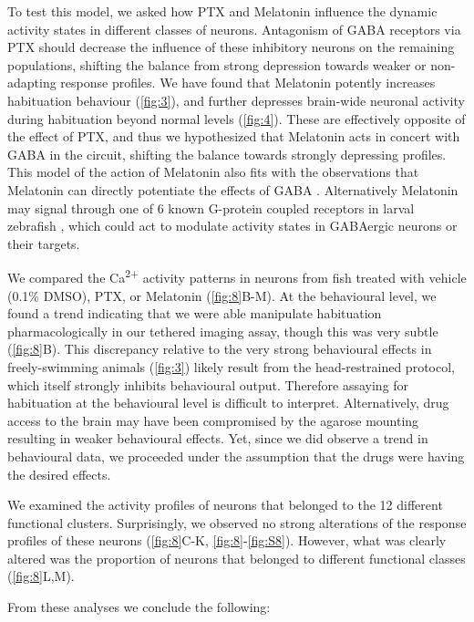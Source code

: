 \documentclass[9pt,lineno]{RandlettLab_elife}
\begin{document}
To test this model, we asked how PTX and Melatonin influence the dynamic activity states in different classes of neurons. Antagonism of GABA receptors via PTX should decrease the influence of these inhibitory neurons on the remaining populations, shifting the balance from strong depression towards weaker or non-adapting response profiles. We have found that Melatonin potently increases habituation behaviour (\autoref{fig:3}), and further depresses brain-wide neuronal activity during habituation beyond normal levels (\autoref{fig:4}). These are effectively opposite of the effect of PTX, and thus we hypothesized that Melatonin acts in concert with GABA in the circuit, shifting the balance towards strongly depressing profiles. This model of the action of Melatonin also fits with the observations that Melatonin can directly potentiate the effects of GABA \cite{Cheng2012-gv, Niles1987-oc}. Alternatively Melatonin may signal through one of 6 known G-protein coupled receptors in larval zebrafish \cite{Maugars2020-pz}, which could act to modulate activity states in GABAergic neurons or their targets. 

We compared the Ca\textsuperscript{2+} activity patterns in neurons from fish treated with vehicle (0.1\% DMSO), PTX, or Melatonin (\autoref{fig:8}B-M). At the behavioural level, we found a trend indicating that we were able manipulate habituation pharmacologically in our tethered imaging assay, though this was very subtle (\autoref{fig:8}B). This discrepancy relative to the very strong behavioural effects in freely-swimming animals (\autoref{fig:3}) likely result from the head-restrained protocol, which itself strongly inhibits behavioural output. Therefore assaying for habituation at the behavioural level is difficult to interpret. Alternatively, drug access to the brain may have been compromised by the agarose mounting resulting in weaker behavioural effects. Yet, since we did observe a trend in behavioural data, we proceeded under the assumption that the drugs were having the desired effects. 

We examined the activity profiles of neurons that belonged to the 12 different functional clusters. Surprisingly, we observed no strong alterations of the response profiles of these neurons (\autoref{fig:8}C-K, \autoref{fig:8}-\autoref{fig:S8}). However, what was clearly altered was the proportion of neurons that belonged to different functional classes (\autoref{fig:8}L,M).

From these analyses we conclude the following:
\end{document}
